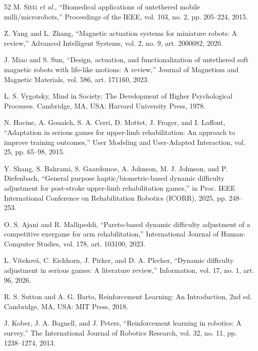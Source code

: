 \documentclass[journal,twoside,web]{ieeecolor2}
\begin{document}
\begin{thebibliography}{52}
\label{bib:b18} M. Sitti \emph{et al.}, ``Biomedical applications of untethered mobile milli/microrobots,'' Proceedings of the IEEE, vol. 103, no. 2, pp. 205--224, 2015.

\label{bib:b19} Z. Yang and L. Zhang, ``Magnetic actuation systems for miniature robots: A review,'' Advanced Intelligent Systems, vol. 2, no. 9, art. 2000082, 2020.

\label{bib:b20} J. Miao and S. Sun, ``Design, actuation, and functionalization of untethered soft magnetic robots with life-like motions: A review,'' Journal of Magnetism and Magnetic Materials, vol. 586, art. 171160, 2023.

\label{bib:b21} L. S. Vygotsky, Mind in Society: The Development of Higher Psychological Processes. Cambridge, MA, USA: Harvard University Press, 1978.

\label{bib:b22} N. Hocine, A. Gouaïch, S. A. Cerri, D. Mottet, J. Froger, and I. Laffont, ``Adaptation in serious games for upper-limb rehabilitation: An approach to improve training outcomes,'' User Modeling and User-Adapted Interaction, vol. 25, pp. 65--98, 2015.

\label{bib:b23} Y. Shang, S. Bahrami, S. Gaardsmoe, A. Johnson, M. J. Johnson, and P. Diefenbach, ``General purpose haptic/biometric-based dynamic difficulty adjustment for post-stroke upper-limb rehabilitation games,'' in Proc. IEEE International Conference on Rehabilitation Robotics (ICORR), 2025, pp. 248--253.

\label{bib:b24} O. S. Ajani and R. Mallipeddi, ``Pareto-based dynamic difficulty adjustment of a competitive exergame for arm rehabilitation,'' International Journal of Human-Computer Studies, vol. 178, art. 103100, 2023.

\label{bib:b25} L. Víteková, C. Eichhorn, J. Pirker, and D. A. Plecher, ``Dynamic difficulty adjustment in serious games: A literature review,'' Information, vol. 17, no. 1, art. 96, 2026.

\label{bib:b26} R. S. Sutton and A. G. Barto, Reinforcement Learning: An Introduction, 2nd ed. Cambridge, MA, USA: MIT Press, 2018.

\label{bib:b27} J. Kober, J. A. Bagnell, and J. Peters, ``Reinforcement learning in robotics: A survey,'' The International Journal of Robotics Research, vol. 32, no. 11, pp. 1238--1274, 2013.


\end{thebibliography}
\end{document}
